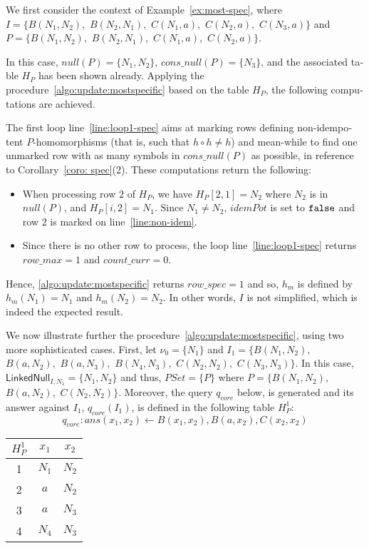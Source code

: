 \begin{otherlanguage}{english}
\begin{example}
    \label{ex:most-spec-DL}
    We first consider the context of Example~\ref{ex:most-spec}, where $I=\{B(N_1,N_2),$ $B(N_2,N_1),$ $C(N_1,a),$ $C(N_2,a),$ $C(N_3,a)\}$ and
    $P=\{B(N_1,N_2),$ $B(N_2,N_1),$ $C(N_1,a),$ $C(N_2,a)\}$.

    In this case, $null(P)=\{N_1, N_2\}$, $cons\_null(P)=\{N_3\}$, and the associated table $H_P$ has been shown already.
    Applying the procedure~\ref{algo:update:mostspecific} based on the table $H_P$, the following computations are achieved.

    The first loop line~\ref{line:loop1-spec} aims at marking rows defining non-idempotent $P$-homomorphisms (that is, such that $h \circ h \ne h$) and mean-while to find one unmarked row with as many symbols in $cons\_null(P)$ as possible, in reference to Corollary~\ref{coro: spec}(2).
    These computations return the following:
    \begin{itemize}
        \item When processing row $2$ of $H_P$, we have $H_P[2,1]=N_2$ where $N_2$ is in $null(P)$, and $H_P[i,2]=N_1$.
              Since $N_1 \ne N_2$, $idemPot$ is set to ${\tt false}$ and row $2$ is marked on line~\ref{line:non-idem}.

        \item Since there is no other row to process, the loop line~\ref{line:loop1-spec} returns $row\_max = 1$ and $count\_curr =0$.
    \end{itemize}
    Hence, \ref{algo:update:mostspecific} returns $row\_spec=1$ and so, $h_m$ is defined by $h_m(N_1)=N_1$ and $h_m(N_2)=N_2$.
    In other words, $I$ is not simplified, which is indeed the expected result.

    We now illustrate further the procedure~\ref{algo:update:mostspecific}, using two more sophisticated cases.
    First, let $\nu_0=\{N_1\}$ and $I_1=\{B(N_1, N_2),$ $B(a, N_2),$ $B(a,N_3),$ $B(N_4,N_3),$ $C(N_2,N_2),$ $C(N_3,N_3)\}$.
    In this case, $\textsf{LinkedNull}_{I,N_1}=\{N_1,N_2\}$ and thus, $PSet = \{P\}$ where $P=\{B(N_1, N_2),$ $B(a,N_2),$ $C(N_2,N_2)\}$.
    Moreover, the query $q_{core}$ below, is generated and its answer against $I_1$, $q_{core}(I_1)$, is defined in the following table $H^1_P$:
    \[
        q_{core}:ans(x_1,x_2) \leftarrow B(x_1, x_2), B(a,x_2),C(x_2,x_2)
    \]

    \begin{center}
        \begin{tabular}{c|cc}
            $H_P^1$ & $x_1$  & $x_2$  \\ \hline
            1       & $N_1 $ & $N_2$  \\
            2       & $a$    & $N_2$  \\
            3       & $a$    & $ N_3$ \\
            4       & $N_4$  & $ N_3$ \\
        \end{tabular}
    \end{center}


\end{example}
\end{otherlanguage}
